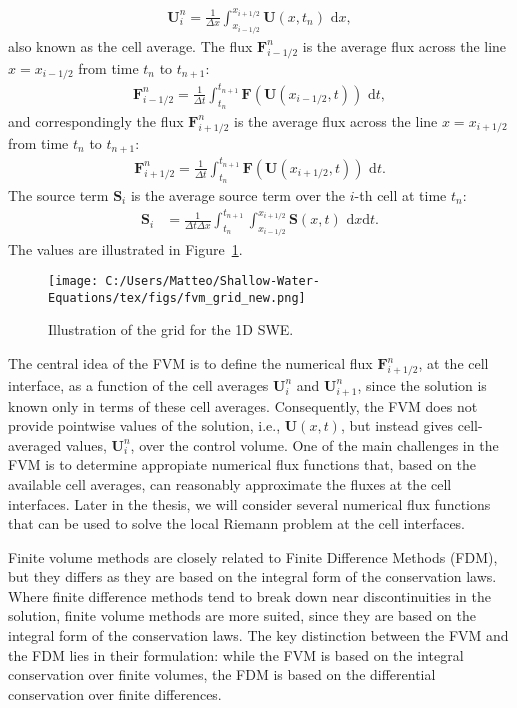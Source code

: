 \begin{align}
    \mathbf{U}_i^n = \frac{1}{\Delta x} \int_{x_{i-1/2}}^{x_{i+1/2}} \mathbf{U}(x,t_n) \text{ d}x,
\end{align}
also known as the cell average.
The flux $\mathbf{F}_{i-1/2}^n$ is the average flux across the line $x = x_{i-1/2}$ from time $t_n$ to $t_{n+1}$:
\begin{align*}
    \mathbf{F}_{i-1/2}^n = \frac{1}{\Delta t} \int_{t_n}^{t_{n+1}} \mathbf{F}(\mathbf{U}(x_{i-1/2},t)) \text{ d}t,
\end{align*}
and correspondingly the flux $\mathbf{F}_{i+1/2}^n$ is the average flux across the line $x = x_{i+1/2}$ from time $t_n$ to $t_{n+1}$:
\begin{align*}
    \mathbf{F}_{i+1/2}^n = \frac{1}{\Delta t} \int_{t_n}^{t_{n+1}} \mathbf{F}(\mathbf{U}(x_{i+1/2},t)) \text{ d}t.
\end{align*}
The source term $\mathbf{S}_i$ is the average source term over the $i$-th cell at time $t_n$:
\begin{align*}
    \mathbf{S}_i &= \frac{1}{\Delta t \Delta x} \int_{t_n}^{t_{n+1}} \int_{x_{i-1/2}}^{x_{i+1/2}} \mathbf{S}(x,t) \text{ d}x\text{d}t.
\end{align*}
The values are illustrated in Figure~\ref{fig:10_3}.
\begin{figure}[H]
    \centering
    \texttt{[image: C:/Users/Matteo/Shallow-Water-Equations/tex/figs/fvm\_grid\_new.png]}
    \caption{Illustration of the grid for the 1D SWE.}\label{fig:10_3}
\end{figure}
The central idea of the FVM is to define the numerical flux $\mathbf{F}_{i+1/2}^n$, at the cell interface, as a function of the cell averages $\mathbf{U}_i^n$ and $\mathbf{U}_{i+1}^n$, since the solution is known only in terms of these cell averages.
Consequently, the FVM does not provide pointwise values of the solution, i.e., $\mathbf{U}(x,t)$, but instead gives cell-averaged values, $\mathbf{U}_i^n$, over the control volume.
One of the main challenges in the FVM is to determine appropiate numerical flux functions that, based on the available cell averages, can reasonably approximate the fluxes at the cell interfaces. 
Later in the thesis, we will consider several numerical flux functions that can be used to solve the local Riemann problem at the cell interfaces.

Finite volume methods are closely related to Finite Difference Methods (FDM), but they differs as they are based on the integral form of the conservation laws.
Where finite difference methods tend to break down near discontinuities in the solution, finite volume methods are more suited, since they are based on the integral form of the conservation laws.
The key distinction between the FVM and the FDM lies in their formulation: while the FVM is based on the integral conservation over finite volumes, the FDM is based on the differential conservation over finite differences.

